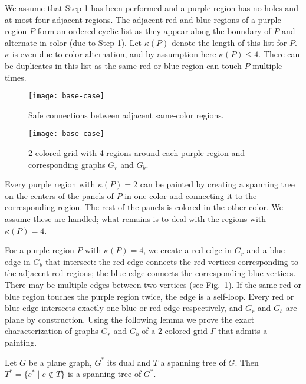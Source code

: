 \documentclass[runningheads]{llncs}
\begin{document}
We assume that Step 1 has been performed and a purple region has no holes and at most four adjacent regions.
The adjacent red and blue regions of a purple region $P$ form an ordered cyclic list as they appear along the boundary of $P$ and alternate in color (due to Step 1).
Let $\kappa(P)$ denote the length of this list for $P$.
$\kappa$ is even due to color alternation, and by assumption here $\kappa(P) \leq 4$.
There can be duplicates in this list as the same red or blue region can touch $P$ multiple times.

\begin{figure}[t]
\begin{minipage}[t]{.37\textwidth}
	\centering
	\texttt{[image: base-case]}
	\caption{Safe connections between adjacent same-color regions.}
    \label{fig:basecase-leader}
\end{minipage}
\hfill
\begin{minipage}[t]{.59\textwidth}
	\centering
	\texttt{[image: base-case]}
	\caption{2-colored grid with 4 regions around each purple region and corresponding graphs $G_r$ and $G_b$.}
    \label{fig:basecase-graphex}
\end{minipage}
\end{figure}

Every purple region with $\kappa(P)=2$ can be painted by creating a spanning tree on the centers of the panels of $P$ in one color and connecting it to the corresponding region. The rest of the panels is colored in the other color.
We assume these are handled; what remains is to deal with the regions with $\kappa(P) = 4$.

For a purple region $P$ with $\kappa(P) = 4$, we create a red edge in $G_r$ and a blue edge in $G_b$ that intersect: the red edge connects the red vertices corresponding to the adjacent red regions; the blue edge connects the corresponding blue vertices. There may be multiple edges between two vertices (see Fig.~\ref{fig:basecase-graphex}). If the same red or blue region touches the purple region twice, the edge is a self-loop.
Every red or blue edge intersects exactly one blue or red edge respectively, and $G_r$ and $G_b$ are plane by construction.
Using the following lemma we prove the exact characterization of graphs $G_r$ and $G_b$ of a 2-colored grid $\Gamma$ that admits a painting.

\begin{lemma}\label{lem:cotree}
Let $G$ be a plane graph, $G^*$ its dual and $T$ a spanning tree of $G$.
Then $T^* = \{ e^* \; | \; e \not\in T \}$ is a spanning tree of $G^*$.
\end{lemma}
\end{document}
